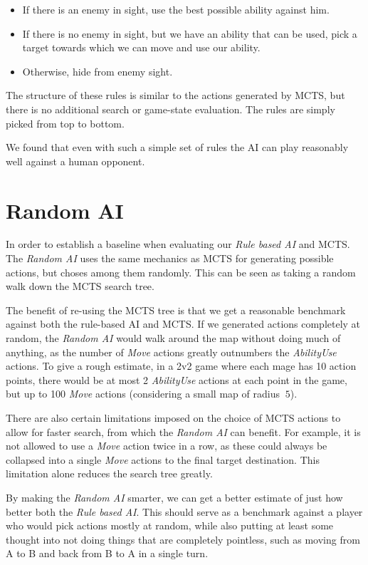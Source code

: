 \begin{itemize}
\item If there is an enemy in sight, use the best possible ability against him.
\item If there is no enemy in sight, but we have an ability that can be used, pick a target towards which we can move and use our ability.
\item Otherwise, hide from enemy sight.
\end{itemize}

The structure of these rules is similar to the actions generated by MCTS,
but there is no additional search or game-state evaluation. The rules are
simply picked from top to bottom.

We found that even with such a simple set of rules the AI can play reasonably
well against a human opponent.


\section{Random AI}

In order to establish a baseline when evaluating our \emph{Rule based AI} and MCTS\@.
The \emph{Random AI} uses the same mechanics as MCTS for generating possible actions,
but choses among them randomly. This can be seen as taking a random walk down
the MCTS search tree.

The benefit of re-using the MCTS tree is that we get a reasonable benchmark against
both the rule-based AI and MCTS\@. If we generated actions completely at random, the \emph{Random AI}
would walk around the map without doing much of anything, as the number of \emph{Move} actions
greatly outnumbers the \emph{AbilityUse} actions. To give a rough estimate, in a 2v2 game where
each mage has 10 action points, there would be at most 2 \emph{AbilityUse} actions at each point
in the game, but up to 100 \emph{Move} actions (considering a small map of radius $~5$).

There are also certain limitations imposed on the choice of MCTS actions to allow for faster search,
from which the \emph{Random AI} can benefit. For example, it is not allowed to use a \emph{Move}
action twice in a row, as these could always be collapsed into a single \emph{Move} actions to the
final target destination. This limitation alone reduces the search tree greatly.

By making the \emph{Random AI} smarter, we can get a better estimate of just how better
both the \emph{Rule based AI}. This should serve as a benchmark against a player who would
pick actions mostly at random, while also putting at least some thought into not doing things
that are completely pointless, such as moving from A to B and back from B to A in a single turn.
